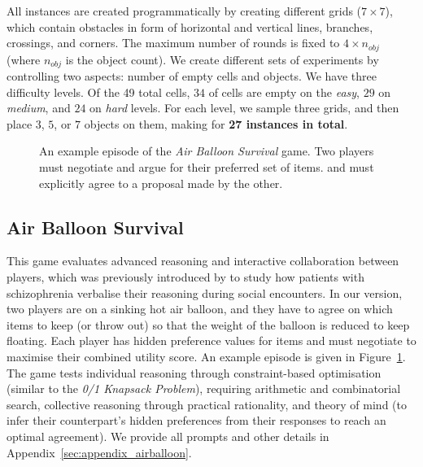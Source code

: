 \documentclass[11pt]{article}
\begin{document}
All instances are created programmatically by creating different grids ($7\times7$), which contain obstacles in form of horizontal and vertical lines, branches, crossings, and corners. The maximum number of rounds is fixed to $4 \times n_{obj}$ (where $n_{obj}$ is the object count). 
We create different sets of experiments by controlling two aspects: number of empty cells and objects. We have three difficulty levels. Of the 49 total cells, $34$ of cells are empty on the \textit{easy}, $29$ on \textit{medium}, and $24$ on \textit{hard} levels. For each level, we sample three grids, and then place $3$, $5$, or $7$ objects on them, making for \textbf{27 instances in total}.

\begin{figure}[ht]
    \centering
    
    \caption{An example episode of the \textit{Air Balloon Survival} game. Two players must negotiate and argue for their preferred set of items. and must explicitly agree to a proposal made by the other.}
    \label{fig:air_balloon_example}
    \vspace*{-.6cm}
\end{figure}

\subsection{Air Balloon Survival}
This game evaluates advanced reasoning and interactive collaboration between players, which was previously introduced by \citet{howes2021justifiable} to study how patients with schizophrenia verbalise their reasoning during social encounters. In our version, two players are on a sinking hot air balloon, and they have to agree on which items to keep (or throw out) so that the weight of the balloon is reduced to keep floating. Each player has hidden preference values for items and must negotiate to maximise their combined utility score. An example episode is given in Figure~\ref{fig:air_balloon_example}. The game tests individual reasoning through constraint-based optimisation (similar to the \textit{0/1 Knapsack Problem}), requiring arithmetic and combinatorial search, collective reasoning through practical rationality, and theory of mind (to infer their counterpart's hidden preferences from their responses to reach an optimal agreement). We provide all prompts and other details in Appendix~\ref{sec:appendix_airballoon}.
\end{document}
